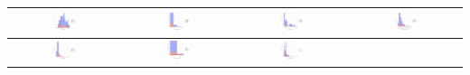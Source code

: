 \begin{table}[!htb]
	\begin{center} 
		\begin{tabular}{ |c|c|c|c| }
			\hline 
			\includegraphics[width=0.21\textwidth]{NOTEBOOK/IMAGENES_BIRCH_DESCRIPTIVAS/1} 
			& \includegraphics[width=0.21\textwidth]{NOTEBOOK/IMAGENES_BIRCH_DESCRIPTIVAS/2} 
			& \includegraphics[width=0.21\textwidth]{NOTEBOOK/IMAGENES_BIRCH_DESCRIPTIVAS/3}
			& \includegraphics[width=0.21\textwidth]{NOTEBOOK/IMAGENES_BIRCH_DESCRIPTIVAS/4} 
			\\  \hline 
			\includegraphics[width=0.21\textwidth]{NOTEBOOK/IMAGENES_BIRCH_DESCRIPTIVAS/5} 
			& \includegraphics[width=0.21\textwidth]{NOTEBOOK/IMAGENES_BIRCH_DESCRIPTIVAS/41} 
			& \includegraphics[width=0.21\textwidth]{NOTEBOOK/IMAGENES_BIRCH_DESCRIPTIVAS/7} 

\end{tabular}
\end{center}
\end{table}
